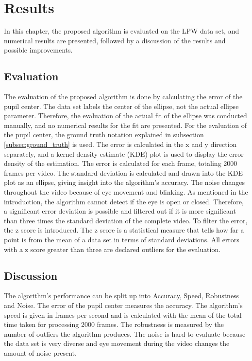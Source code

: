 \chapter{Results}
In this chapter, the proposed algorithm is evaluated on the LPW data set, and numerical results are presented, followed by a discussion of the results and possible improvements.
\section{Evaluation}
The evaluation of the proposed algorithm is done by calculating the error of the pupil center. The data set labels the center of the ellipse, not the actual ellipse parameter. Therefore, the evaluation of the actual fit of the ellipse was conducted manually, and no numerical results for the fit are presented. For the evaluation of the pupil center, the ground truth notation explained in subsection \ref{subsec:ground_truth} is used. The error is calculated in the x and y direction separately, and a kernel density estimate (KDE) plot is used to display the error density of the estimation. The error is calculated for each frame, totaling 2000 frames per video. The standard deviation is calculated and drawn into the KDE plot as an ellipse, giving insight into the algorithm's accuracy. The noise changes throughout the video because of eye movement and blinking. As mentioned in the introduction, the algorithm cannot detect if the eye is open or closed. Therefore, a significant error deviation is possible and filtered out if it is more significant than three times the standard deviation of the complete video. To filter the error, the z score is introduced. The z score is a statistical measure that tells how far a point is from the mean of a data set in terms of standard deviations. All errors with a z score greater than three are declared outliers for the evaluation. 

\section{Discussion}
The algorithm's performance can be split up into Accuracy, Speed, Robustness and Noise. The error of the pupil center measures the accuracy. The algorithm's speed is given in frames per second and is calculated with the mean of the total time taken for processing 2000 frames. The robustness is measured by the number of outliers the algorithm produces. The noise is hard to evaluate because the data set is very diverse and eye movement during the video changes the amount of noise present.
